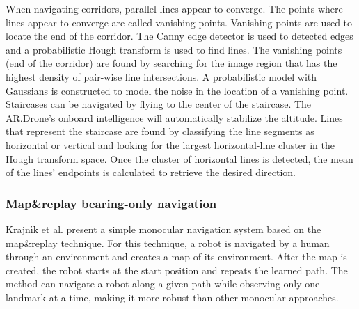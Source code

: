 When navigating corridors, parallel lines appear to converge.
The points where lines appear to converge are called vanishing points.
Vanishing points are used to locate the end of the corridor. 
The Canny edge detector \cite{canny1986computational} is used to detected edges and a probabilistic Hough transform \cite{kiryati1991probabilistic} is used to find lines.
The vanishing points (end of the corridor) are found by searching for the image region that has the highest density of pair-wise line intersections.
A probabilistic model with Gaussians is constructed to model the noise in the location of a vanishing point.
Staircases can be navigated by flying to the center of the staircase. %
The AR.Drone's onboard intelligence will automatically stabilize the altitude.
Lines that represent the staircase are found by classifying the line segments as horizontal or vertical and looking for the largest horizontal-line cluster in the Hough transform space.
Once the cluster of horizontal lines is detected, the mean of the lines' endpoints is calculated to retrieve the desired direction.

\subsubsection{Map\&replay bearing-only navigation}
Krajn{\'\i}k et al. \cite{krajník2010simple,faiglsurveillance,krajník2011ar} present a simple monocular navigation system based on the map\&replay technique.
For this technique, a robot is navigated by a human through an environment and creates a map of its environment.
After the map is created, the robot starts at the start position and repeats the learned path.
The method can navigate a robot along a given path while observing only one landmark at a time, making it more robust than other monocular approaches.

